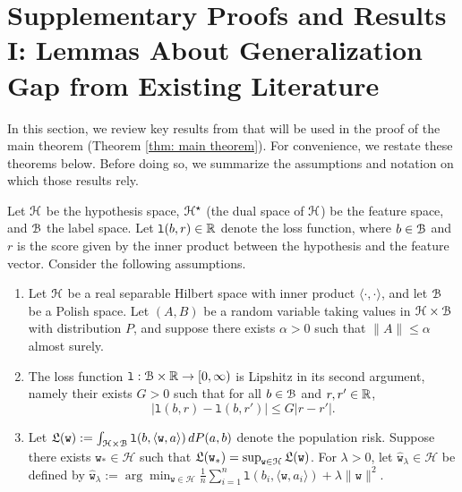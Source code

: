 
\section{Supplementary Proofs and Results I: Lemmas About Generalization Gap from Existing Literature}

In this section, we review key results from \cite{della2021regularized} that will be used in the proof of the main theorem (Theorem \ref{thm: main theorem}). For convenience, we restate these theorems below. Before doing so, we summarize the assumptions and notation on which those results rely.

Let $\mathcal{H}$ be the hypothesis space, $\mathcal{H}^\star$ (the dual space of $\mathcal{H}$) be the feature space, and $\mathcal{B}$ the label space. Let $\mathtt{l}(b, r) \in \mathbb{R}$ denote the loss function, where $b \in \mathcal{B}$ and $r$ is the score given by the inner product between the hypothesis and the feature vector. Consider the following assumptions.
\begin{enumerate}
    \item[(A1)] Let $\mathcal{H}$ be a real separable Hilbert space with inner product $\langle \cdot, \cdot \rangle$, and let $\mathcal{B}$ be a Polish space.
    Let $(A, B)$ be a random variable taking values in $\mathcal{H} \times \mathcal{B}$ with distribution $P$, and suppose there exists $\alpha > 0$ such that $\|A\| \leq \alpha$ almost surely.   

    \item[(A2)] The loss function $\mathtt{l}: \mathcal{B} \times \mathbb{R} \rightarrow [0,\infty)$ is Lipshitz in its second argument, namely their exists $G > 0$ such that for all $b \in \mathcal{B}$ and $r,r' \in \mathbb{R}$,
    \begin{equation*}
        |\mathtt{l}(b,r) - \mathtt{l}(b,r')| \leq G|r-r'|.
    \end{equation*}
    \item[(A3)] Let $\mathfrak{L}(\mathtt{w}) := \int_{\mathcal{H} \times \mathcal{B}} \mathtt{l}(b, \langle \mathtt{w}, a \rangle) \, dP(a, b)$ denote the population risk. Suppose there exists $\mathtt{w}_* \in \mathcal{H}$ such that $\mathfrak{L}(\mathtt{w}_*) = \sup_{\mathtt{w} \in \mathcal{H}} \mathfrak{L}(\mathtt{w})$. For $\lambda > 0$, let $\widehat{\mathtt{w}}_\lambda \in \mathcal{H}$ be defined by $\widehat{\mathtt{w}}_\lambda := \arg\min_{\mathtt{w} \in \mathcal{H}} \frac{1}{n} \sum_{i=1}^n \mathtt{l}(b_i, \langle \mathtt{w}, a_i \rangle) + \lambda \|\mathtt{w}\|^2$.
\end{enumerate}

